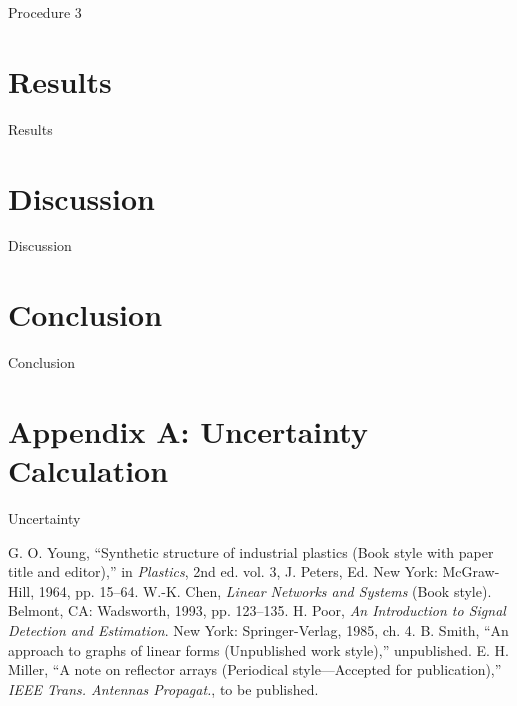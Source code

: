\documentclass[journal,letterpaper]{IEEEtran}
\begin{document}
Procedure 3


\section{Results}


Results


\section{Discussion}


Discussion


\section{Conclusion}


Conclusion


\section*{Appendix A: Uncertainty Calculation}


Uncertainty


\begin{thebibliography}{9}
     G. O. Young, ``Synthetic structure of industrial plastics (Book style with paper title and editor),'' in \textit{Plastics}, 2nd ed. vol. 3, J. Peters, Ed. New York: McGraw-Hill, 1964, pp. 15--64.
     W.-K. Chen, \textit{Linear Networks and Systems} (Book style).	Belmont, CA: Wadsworth, 1993, pp. 123--135.
     H. Poor, \textit{An Introduction to Signal Detection and Estimation}. New York: Springer-Verlag, 1985, ch. 4.
     B. Smith, ``An approach to graphs of linear forms (Unpublished work style),'' unpublished.
     E. H. Miller, ``A note on reflector arrays (Periodical style—Accepted for publication),'' \textit{IEEE Trans. Antennas Propagat.}, to be published.
\end{thebibliography}
\end{document}
